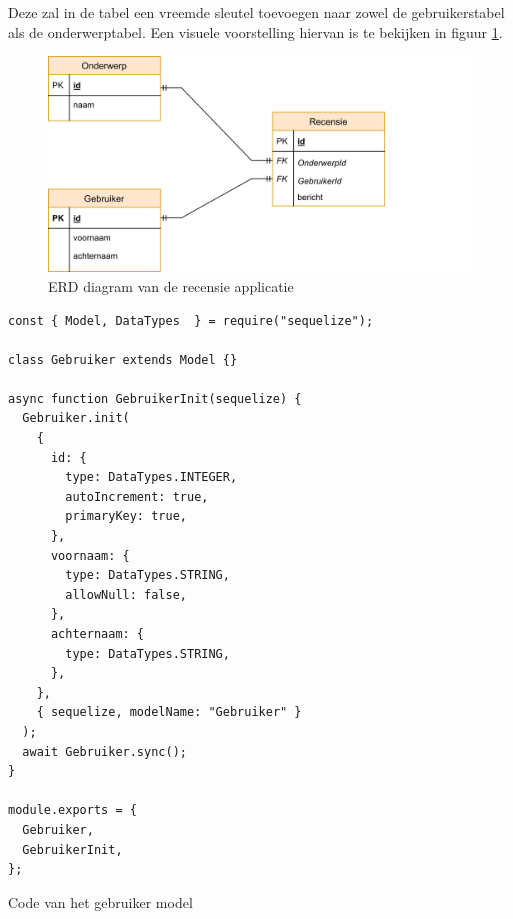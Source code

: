 Deze zal in de tabel een vreemde sleutel toevoegen naar zowel de gebruikerstabel als de onderwerptabel.
Een visuele voorstelling hiervan is te bekijken in figuur \ref{fig:erd}.
\begin{figure}[H]
  \centering
  \includegraphics{graphics/erd.png}
  \caption{\label{fig:erd}ERD diagram van de recensie applicatie}
\end{figure}
\begin{listing}[H]
  \centering
  \begin{verbatim}
const { Model, DataTypes  } = require("sequelize");

class Gebruiker extends Model {}

async function GebruikerInit(sequelize) {
  Gebruiker.init(
    {
      id: {
        type: DataTypes.INTEGER,
        autoIncrement: true,
        primaryKey: true,
      },
      voornaam: {
        type: DataTypes.STRING,
        allowNull: false,
      },
      achternaam: {
        type: DataTypes.STRING,
      },
    },
    { sequelize, modelName: "Gebruiker" }
  );
  await Gebruiker.sync();
}

module.exports = {
  Gebruiker,
  GebruikerInit,
};
\end{verbatim}
\caption{\label{code:User}Code van het gebruiker model}
\end{listing}

